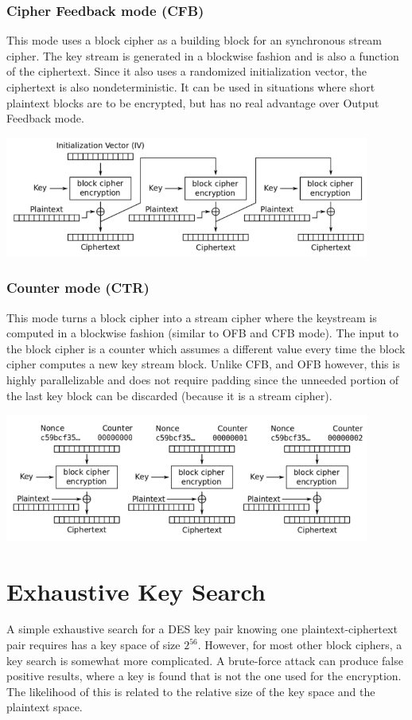 \documentclass{math}
\begin{document}
\subsubsection*{Cipher Feedback mode (CFB)}
This mode uses a block cipher as a building block for an synchronous stream
cipher. The key stream is generated in a blockwise fashion and is also a
function of the ciphertext. Since it also uses a randomized initialization
vector, the ciphertext is also nondeterministic. It can be used in situations
where short plaintext blocks are to be encrypted, but has no real advantage
over Output Feedback mode.
\begin{center}
  \includegraphics[width=12cm]{assets/cfb.png}
\end{center}

\subsubsection*{Counter mode (CTR)}
This mode turns a block cipher into a stream cipher where the keystream is
computed in a blockwise fashion (similar to OFB and CFB mode). The input to the
block cipher is a counter which assumes a different value every time the block
cipher computes a new key stream block. Unlike CFB, and OFB however, this is
highly parallelizable and does not require padding since the unneeded portion
of the last key block can be discarded (because it is a stream cipher).
\begin{center}
  \includegraphics[width=12cm]{assets/ctr.png}
\end{center}

\section*{Exhaustive Key Search}
A simple exhaustive search for a DES key pair knowing one plaintext-ciphertext
pair requires has a key space of size \( 2^56 \). However, for most other block
ciphers, a key search is somewhat more complicated. A brute-force attack can
produce false positive results, where a key is found that is not the one used
for the encryption. The likelihood of this is related to the relative size of
the key space and the plaintext space.
\end{document}
